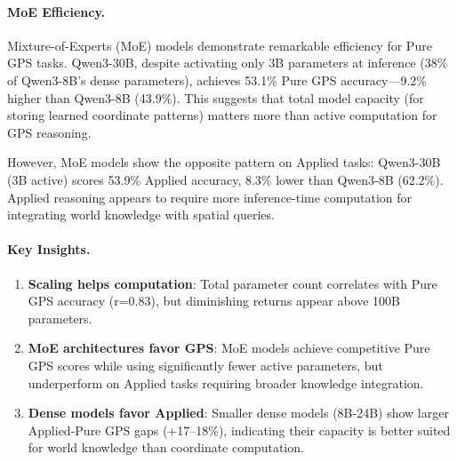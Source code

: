 \paragraph{MoE Efficiency.}
Mixture-of-Experts (MoE) models demonstrate remarkable efficiency for Pure GPS tasks. Qwen3-30B, despite activating only 3B parameters at inference (38\% of Qwen3-8B's dense parameters), achieves 53.1\% Pure GPS accuracy---9.2\% higher than Qwen3-8B (43.9\%). This suggests that total model capacity (for storing learned coordinate patterns) matters more than active computation for GPS reasoning.

However, MoE models show the opposite pattern on Applied tasks: Qwen3-30B (3B active) scores 53.9\% Applied accuracy, 8.3\% lower than Qwen3-8B (62.2\%). Applied reasoning appears to require more inference-time computation for integrating world knowledge with spatial queries.

\paragraph{Key Insights.}
\begin{enumerate}[leftmargin=*, itemsep=2pt]
    \item \textbf{Scaling helps computation}: Total parameter count correlates with Pure GPS accuracy (r=0.83), but diminishing returns appear above 100B parameters.

    \item \textbf{MoE architectures favor GPS}: MoE models achieve competitive Pure GPS scores while using significantly fewer active parameters, but underperform on Applied tasks requiring broader knowledge integration.

    \item \textbf{Dense models favor Applied}: Smaller dense models (8B-24B) show larger Applied-Pure GPS gaps (+17--18\%), indicating their capacity is better suited for world knowledge than coordinate computation.
\end{enumerate}
